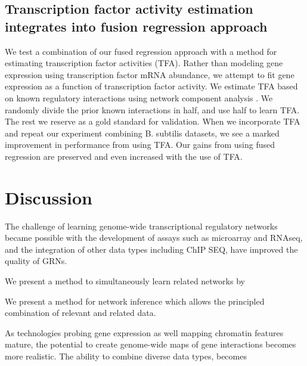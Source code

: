 \documentclass[11pt]{article}
\begin{document}
\subsection{Transcription factor activity estimation integrates into fusion regression approach}
We test a combination of our fused regression approach with a method for estimating transcription factor activities (TFA). Rather than modeling gene expression using transcription factor mRNA abundance, we attempt to fit gene expression as a function of transcription factor activity. We estimate TFA based on known regulatory interactions using network component analysis \cite{liao2003network}. We randomly divide the prior known interactions in half, and use half to learn TFA. The rest we reserve as a gold standard for validation. When we incorporate TFA and repeat our experiment combining B. subtilis datasets, we see a marked improvement in performance from using TFA. Our gains from using fused regression are preserved and even increased with the use of TFA. 

\section{Discussion}
The challenge of learning genome-wide transcriptional regulatory networks became possible with the development of assays such as microarray and RNAseq, and the integration of other data types including ChIP SEQ, have improved the quality of GRNs. 

We present a method to simultaneously learn related networks by  

We present a method for network inference which allows the principled combination of relevant and related data. 

As technologies probing gene expression as well mapping chromatin features mature, the potential to create genome-wide maps of gene interactions becomes more realistic. The ability to combine diverse data types, becomes 



\end{document}
